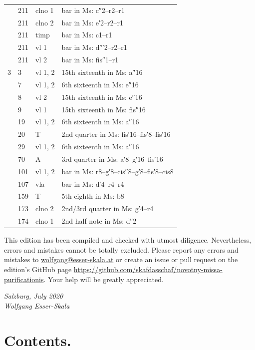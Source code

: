 \documentclass[parskip=full]{scrreprt}
\newif\iftemplate\templatetrue
\begin{document}
\begin{longtable}{lll L{10cm}}
	  & 211 & clno 1  & bar in Ms: c″2–r2–r1 \\
	  & 211 & clno 2  & bar in Ms: e′2–r2–r1 \\
	  & 211 & timp    & bar in Ms: c1–r1 \\
	  & 211 & vl 1    & bar in Ms: d′′′2–r2–r1 \\
	  & 211 & vl 2    & bar in Ms: fis″1–r1 \\
	3 & 3   & vl 1, 2 & 15th sixteenth in Ms: a″16 \\
	  & 7   & vl 1, 2 & 6th sixteenth in Ms: e″16 \\
	  & 8   & vl 2    & 15th sixteenth in Ms: e″16 \\
	  & 9   & vl 1    & 15th sixteenth in Ms: fis″16 \\
	  & 19  & vl 1, 2 & 6th sixteenth in Ms: a″16 \\
	  & 20  & T       & 2nd quarter in Ms: fis′16–fis′8–fis′16 \\
	  & 29  & vl 1, 2 & 6th sixteenth in Ms: a″16 \\
	  & 70  & A       & 3rd quarter in Ms: a′8–g′16–fis′16 \\
	  & 101 & vl 1, 2 & bar in Ms: r8–g′8–cis″8–g′8–fis′8–cis8 \\
	  & 107 & vla     & bar in Ms: d′4–r4–r4 \\
	  & 159 & T       & 5th eighth in Ms: b8 \\
	  & 173 & clno 2  & 2nd/3rd quarter in Ms: g′4–r4 \\
	  & 174 & clno 1  & 2nd half note in Ms: d″2 \\
	\bottomrule
\end{longtable}


This edition has been compiled and checked with utmost diligence. Nevertheless, errors and mistakes cannot be totally excluded. Please report any errors and mistakes to \url{wolfgang@esser-skala.at} or create an issue or pull request on the edition’s GitHub page \url{https://github.com/skafdasschaf/novotny-missa-purificationis}. Your help will be greatly appreciated.

\bigskip
\textit{Salzburg, July 2020\\
Wolfgang Esser-Skala}

\cleardoublepage
\chapter*{Contents.}


\cleardoublepage
\fi

\iftemplate

\fi
\end{document}
